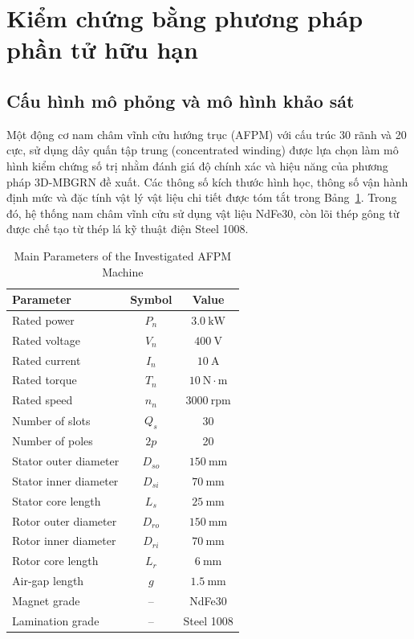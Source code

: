 \section{Kiểm chứng bằng phương pháp phần tử hữu hạn}

\subsection{Cấu hình mô phỏng và mô hình khảo sát}

Một động cơ nam châm vĩnh cửu hướng trục (AFPM) với cấu trúc 30 rãnh và 20 cực, sử dụng dây quấn tập trung (concentrated winding) được lựa chọn làm mô hình kiểm chứng số trị nhằm đánh giá độ chính xác và hiệu năng của phương pháp 3D-MBGRN đề xuất. Các thông số kích thước hình học, thông số vận hành định mức và đặc tính vật lý vật liệu chi tiết được tóm tắt trong Bảng~\ref{afpm_par}. Trong đó, hệ thống nam châm vĩnh cửu sử dụng vật liệu NdFe30, còn lõi thép gông từ được chế tạo từ thép lá kỹ thuật điện Steel 1008.

\begin{table}[htbp]
\centering
\caption{Main Parameters of the Investigated AFPM Machine}
\label{afpm_par}
\begin{tabular}{lcc}
\hline
\textbf{Parameter} & \textbf{Symbol} & \textbf{Value} \\
\hline
Rated power & $P_n$ & $3.0~\text{kW}$ \\
Rated voltage & $V_n$ & $400~\text{V}$ \\
Rated current & $I_n$ & $10~\text{A}$ \\
Rated torque & $T_n$ & $10~\text{N}\cdot\text{m}$ \\
Rated speed & $n_n$ & $3000~\text{rpm}$ \\
Number of slots & $Q_s$ & 30 \\
Number of poles & $2p$ & 20 \\
Stator outer diameter & $D_{so}$ & $150~\text{mm}$ \\
Stator inner diameter & $D_{si}$ & $70~\text{mm}$ \\
Stator core length & $L_s$ & $25~\text{mm}$ \\
Rotor outer diameter & $D_{ro}$ & $150~\text{mm}$ \\
Rotor inner diameter & $D_{ri}$ & $70~\text{mm}$ \\
Rotor core length & $L_r$ & $6~\text{mm}$ \\
Air-gap length & $g$ & $1.5~\text{mm}$ \\
Magnet grade & -- & NdFe30 \\
Lamination grade & -- & Steel 1008 \\
\hline
\end{tabular}
\end{table}

